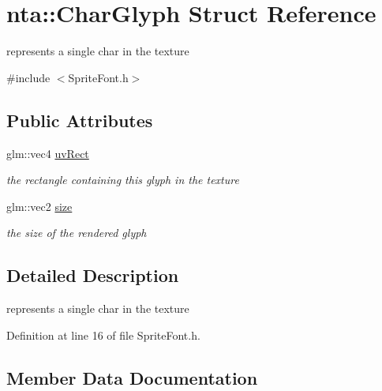 \hypertarget{structnta_1_1CharGlyph}{}\section{nta\+:\+:Char\+Glyph Struct Reference}
\label{structnta_1_1CharGlyph}


represents a single char in the texture  




{\ttfamily \#include $<$Sprite\+Font.\+h$>$}

\subsection*{Public Attributes}
\begin{DoxyCompactItemize}
\item 
\mbox{\label{structnta_1_1CharGlyph_a46d9ea9c38c8bf5e1c1679e938019f53}} 
glm\+::vec4 \hyperlink{structnta_1_1CharGlyph_a46d9ea9c38c8bf5e1c1679e938019f53}{uv\+Rect}
\begin{DoxyCompactList}\small\item\em the rectangle containing this glyph in the texture \end{DoxyCompactList}\item 
\mbox{\label{structnta_1_1CharGlyph_aa2a40e6fe48ffadb4c7c95af7e82db91}} 
glm\+::vec2 \hyperlink{structnta_1_1CharGlyph_aa2a40e6fe48ffadb4c7c95af7e82db91}{size}
\begin{DoxyCompactList}\small\item\em the size of the rendered glyph \end{DoxyCompactList}\end{DoxyCompactItemize}


\subsection{Detailed Description}
represents a single char in the texture 

Definition at line 16 of file Sprite\+Font.\+h.



\subsection{Member Data Documentation}
\mbox{\label{structnta_1_1CharGlyph_aa2a40e6fe48ffadb4c7c95af7e82db91}} 
